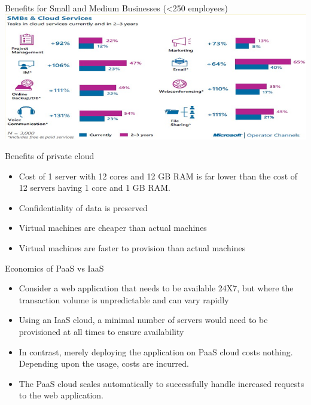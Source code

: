 \documentclass{SKP-beamer}
\begin{document}
\begin{frame}{Benefits for Small and Medium Businesses (<250 employees)}
	\includegraphics[scale=0.8]{b.png}
\end{frame}


\begin{frame}{Benefits of private cloud}
	\begin{itemize}
		\item Cost of 1 server with 12 cores and 12 GB RAM is far lower than the cost of 12 servers having 1 core and 1 GB RAM.
		\item Confidentiality of data is preserved
		\item Virtual machines are cheaper than actual machines
		\item Virtual machines are faster to provision than actual machines	
	\end{itemize}
\end{frame}

\begin{frame}{Economics of PaaS vs IaaS}
	\begin{itemize}
		\item Consider a web application that needs to be available 24X7, but
		where the transaction volume is unpredictable and can vary rapidly
		\item Using an IaaS cloud, a minimal number of servers would need to be
		provisioned at all times to ensure availability
		\item In contrast, merely deploying the application on PaaS cloud costs nothing. Depending upon the usage, costs are incurred.
		\item The PaaS cloud scales automatically to successfully handle increased requests to the web application.
		
	\end{itemize}
\end{frame}
\end{document}

